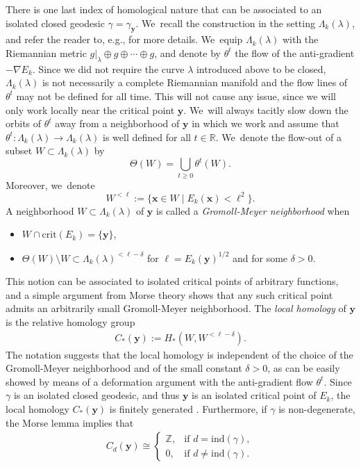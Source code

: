 \documentclass[11pt]{article}
\let\sep\mid
\let\bm\boldsymbol
\newcommand{\Z}{\mathbb{Z}}
\newcommand{\R}{\mathbb{R}}
\newcommand{\xx}{\bm{x}}
\newcommand{\yy}{\bm{y}}
\newcommand{\crit}{\mathrm{crit}}
\newcommand{\ind}{\mathrm{ind}}
\theoremstyle{plain}
\theoremstyle{definition}
\begin{document}
There is one last index of homological nature that can be associated to an isolated closed geodesic $\gamma=\gamma_{\yy}$. We~recall the construction in the setting $\Lambda_k(\lambda)$, and refer the reader to, e.g., \cite{Rademacher:1992aa,Bangert:2010aa,Asselle:2018aa} for more details. We~equip $\Lambda_k(\lambda)$ with the Riemannian metric $g|_\lambda\oplus g\oplus\cdots\oplus g$, and denote by $\theta^t$ the flow of the anti-gradient $-\nabla E_k$.
Since we did not require the curve $\lambda$ introduced above to be closed, $\Lambda_k(\lambda)$ is not necessarily a complete Riemannian manifold and the flow lines of $\theta^t$ may not be defined for all time. This will not cause any issue, since we will only work locally near the critical point $\yy$. We~will always tacitly slow down the orbits of $\theta^t$ away from a neighborhood of $\yy$ in which we work and assume that $\theta^t:\Lambda_k(\lambda)\to\Lambda_k(\lambda)$ is well defined for all $t\in\R$. We~denote the flow-out of a subset $W\subset\Lambda_k(\lambda)$ by
\[
\Theta(W)=\bigcup_{t\geq0} \theta^t(W).
\]
Moreover, we~denote \[
W^{<\ell}:=\big\{\xx\in W\sep E_k(\xx)<\ell^2\big\}.
\]
A neighborhood $W\subset \Lambda_k(\lambda)$ of $\yy$ is called a \emph{Gromoll-Meyer neighborhood} when
\begin{itemize}
\item $W\cap\crit(E_k)=\{\yy\}$,
\item $\Theta(W)\setminus W\subset \Lambda_k(\lambda)^{<\ell-\delta}$ for $\ell=E_k(\yy)^{1/2}$ and for some $\delta>0$.
\end{itemize}
This notion can be associated to isolated critical points of arbitrary functions, and a simple argument from Morse theory shows that any such critical point admits an arbitrarily small Gromoll-Meyer neighborhood.
The \emph{local homology} of $\yy$ is the relative homology group
\begin{align*}
C_*(\yy):=H_*(W,W^{<\ell-\delta}).
\end{align*}
The notation suggests that the local homology is independent of the choice of the Gromoll-Meyer neighborhood and of the small constant $\delta>0$, as can be easily showed by means of a deformation argument with the anti-gradient flow $\theta^t$.
Since $\gamma$ is an isolated closed geodesic, and thus $\yy$ is an isolated critical point of $E_k$, the local homology $C_*(\yy)$ is finitely generated \cite[p.\,364]{Gromoll:1969aa}. Furthermore, if $\gamma$ is non-degenerate, the Morse lemma \cite[Lem.\,2.2]{Milnor:1963aa} implies that
\begin{align}
\label{e:loc_hom_1}
C_d(\yy)
\cong
\begin{cases}
\Z, & \text{if } d=\ind(\gamma),\\
0, & \text{if } d\neq\ind(\gamma).
\end{cases}
\end{align}
\end{document}
